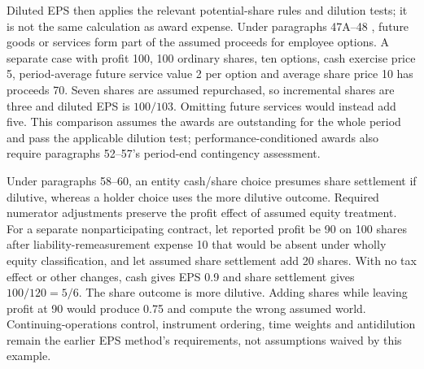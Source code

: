 Diluted EPS then applies the relevant potential-share rules and dilution tests; it is not the same calculation as award expense. Under paragraphs 47A--48 \citep[IAS~33.47A--60]{eu20231803}, future goods or services form part of the assumed proceeds for employee options. A separate case with profit 100, 100 ordinary shares, ten options, cash exercise price 5, period-average future service value 2 per option and average share price 10 has proceeds 70. Seven shares are assumed repurchased, so incremental shares are three and diluted EPS is \(100/103\). Omitting future services would instead add five. This comparison assumes the awards are outstanding for the whole period and pass the applicable dilution test; performance-conditioned awards also require paragraphs 52--57's period-end contingency assessment.

Under paragraphs 58--60, an entity cash/share choice presumes share settlement if dilutive, whereas a holder choice uses the more dilutive outcome. Required numerator adjustments preserve the profit effect of assumed equity treatment. For a separate nonparticipating contract, let reported profit be 90 on 100 shares after liability-remeasurement expense 10 that would be absent under wholly equity classification, and let assumed share settlement add 20 shares. With no tax effect or other changes, cash gives EPS 0.9 and share settlement gives \(100/120=5/6\). The share outcome is more dilutive. Adding shares while leaving profit at 90 would produce 0.75 and compute the wrong assumed world. Continuing-operations control, instrument ordering, time weights and antidilution remain the earlier EPS method's requirements, not assumptions waived by this example.





